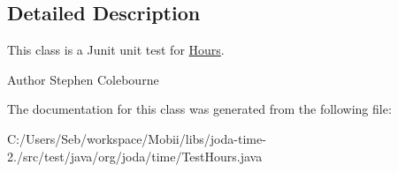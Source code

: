 \subsection{Detailed Description}
This class is a Junit unit test for \hyperlink{classorg_1_1joda_1_1time_1_1_hours}{Hours}.

\begin{DoxyAuthor}{Author}
Stephen Colebourne 
\end{DoxyAuthor}


The documentation for this class was generated from the following file\-:\begin{DoxyCompactItemize}
\item 
C\-:/\-Users/\-Seb/workspace/\-Mobii/libs/joda-\/time-\/2./src/test/java/org/joda/time/Test\-Hours.\-java\end{DoxyCompactItemize}
